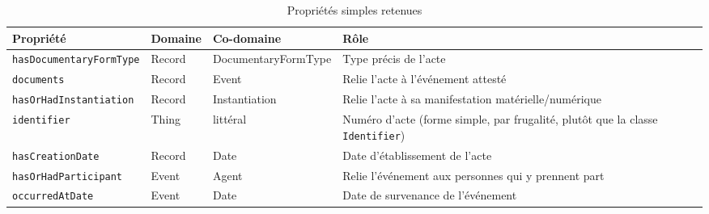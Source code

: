 \begin{table}[htbp]
    \centering
    \small
    \caption{Propriétés simples retenues}
    \label{tab:proprietes-rico}
    \begin{tabularx}{\textwidth}{
            >{\raggedright\arraybackslash\hsize=1.1\hsize}X
            >{\raggedright\arraybackslash\hsize=0.7\hsize}X
            >{\raggedright\arraybackslash\hsize=0.8\hsize}X
            >{\raggedright\arraybackslash\hsize=1.4\hsize}X
        }
        \toprule
        \textbf{Propriété}                                      & \textbf{Domaine} & \textbf{Co-domaine}             & \textbf{Rôle}                                                                         \\
        \midrule
        \texttt{has\allowbreak Documentary\allowbreak FormType} & Record           & Documentary\allowbreak FormType & Type précis de l'acte                                                                 \\
        \midrule
        \texttt{documents}                                      & Record           & Event                           & Relie l'acte à l'événement attesté                                                    \\
        \midrule
        \texttt{has\allowbreak OrHad\allowbreak Instantiation}  & Record           & Instantiation                   & Relie l'acte à sa manifestation matérielle/numérique                                  \\
        \midrule
        \texttt{identifier}                                     & Thing            & littéral                        & Numéro d'acte (forme simple, par frugalité, plutôt que la classe \texttt{Identifier}) \\
        \midrule
        \texttt{has\allowbreak Creation\allowbreak Date}        & Record           & Date                            & Date d'établissement de l'acte                                                        \\
        \midrule
        \texttt{has\allowbreak OrHad\allowbreak Participant}    & Event            & Agent                           & Relie l'événement aux personnes qui y prennent part                                   \\
        \midrule
        \texttt{occurred\allowbreak AtDate}                     & Event            & Date                            & Date de survenance de l'événement                                                     \\

\end{tabularx}
\end{table}
